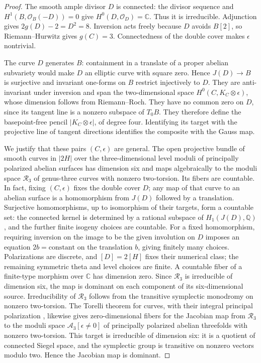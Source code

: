 \documentclass[11pt]{amsart}
\newcommand{\Q}{\mathbb Q}
\newcommand{\C}{\mathbb C}
\theoremstyle{definition}
\theoremstyle{remark}
\numberwithin{equation}{section}
\begin{document}
\begin{proof}
The smooth ample divisor $D$ is connected: the divisor sequence and
$H^1(B,\mathcal O_B(-D))=0$ give $H^0(D,\mathcal O_D)=\C$.
Thus it is irreducible.  Adjunction gives $2g(D)-2=D^2=8$.
Inversion acts freely because $D$ avoids $B[2]$, so Riemann--Hurwitz
gives $g(C)=3$.  Connectedness of the double cover makes $\epsilon$
nontrivial.

The curve $D$ generates $B$: containment in a translate of a proper
abelian subvariety would make $D$ an elliptic curve with square zero.
Hence $J(D)\to B$ is surjective and
invariant one-forms on $B$ restrict injectively to $D$.  They are
anti-invariant under inversion and span the two-dimensional space
$H^0(C,K_C\otimes\epsilon)$, whose dimension follows from
Riemann--Roch.  They have no common zero on $D$, since its tangent
line is a nonzero subspace of $T_0B$.  They therefore define the
basepoint-free pencil $|K_C\otimes\epsilon|$, of degree four.
Identifying its target with the projective line of tangent directions
identifies the composite with the Gauss map.

We justify that these pairs $(C,\epsilon)$ are general.  The open
projective bundle of smooth curves in $|2H|$ over the three-dimensional
level moduli of principally polarized abelian surfaces has dimension
six and maps algebraically to the moduli space $\mathcal R_3$ of
genus-three curves with nonzero two-torsion.  Its fibers are countable.
In fact, fixing $(C,\epsilon)$ fixes the double cover $D$; any map of
that curve to an abelian surface is a homomorphism from $J(D)$ followed
by a translation.  Surjective homomorphisms, up to isomorphism of
their targets, form a countable set: the connected kernel is
determined by a rational subspace of $H_1(J(D),\Q)$, and the further
finite isogeny choices are countable.  For a fixed homomorphism,
requiring inversion on the image to be the given
involution on $D$ imposes an equation $2b=\text{constant}$ on the
translation $b$, giving finitely many choices.  Polarizations are
discrete, and $[D]=2[H]$ fixes their numerical class; the remaining
symmetric theta and level choices are finite.  A countable fiber of a
finite-type morphism over $\C$ has dimension zero.  Since
$\mathcal R_3$ is irreducible of dimension six, the map is dominant
on each component of its six-dimensional source.  Irreducibility of
$\mathcal R_3$ follows from the transitive symplectic monodromy on
nonzero two-torsion.  The Torelli theorem for curves, with their
integral principal polarization
\cite[Chapter~3, Theorem~2.2]{Huybrechts}, likewise gives
zero-dimensional fibers for the Jacobian map from $\mathcal R_3$
to the moduli space $\mathcal A_3[\epsilon\ne0]$ of principally
polarized abelian threefolds with nonzero two-torsion.  This target
is irreducible of dimension six: it is a quotient of connected
Siegel space, and the symplectic group is transitive on nonzero
vectors modulo two.  Hence the Jacobian map is dominant.


\end{proof}
\end{document}
